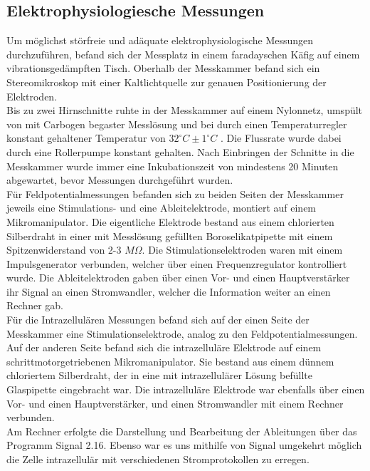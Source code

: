 \documentclass[a4paper,11pt]{report}
\begin{document}
{\subsection{Elektrophysiologiesche Messungen} 

Um möglichst störfreie und adäquate elektrophysiologische Messungen durchzuführen, befand sich der Messplatz in einem faradayschen Käfig auf einem vibrationsgedämpften Tisch. Oberhalb der Messkammer befand sich ein Stereomikroskop mit einer Kaltlichtquelle zur genauen Positionierung der Elektroden.\\

Bis zu zwei Hirnschnitte ruhte in der Messkammer auf einem Nylonnetz, umspült von mit Carbogen begaster Messlösung und bei durch einen Temperaturregler konstant gehaltener Temperatur von $32^\circ C \pm 1^\circ C$ . Die Flussrate wurde dabei durch eine Rollerpumpe konstant gehalten. Nach Einbringen der Schnitte in die Messkammer wurde immer eine Inkubationszeit von mindestens 20 Minuten abgewartet, bevor Messungen durchgeführt wurden.\\

Für Feldpotentialmessungen befanden sich zu beiden Seiten der Messkammer jeweils eine Stimulations- und eine Ableitelektrode, montiert auf einem Mikromanipulator. Die eigentliche Elektrode bestand aus einem chlorierten Silberdraht in einer mit Messlösung gefüllten Boroselikatpipette mit einem Spitzenwiderstand von 2-3 $M\Omega$. Die Stimulationselektroden waren mit einem Impulsgenerator verbunden, welcher über einen Frequenzregulator kontrolliert wurde. Die Ableitelektroden gaben über einen Vor- und einen Hauptverstärker ihr Signal an einen Stromwandler, welcher die Information weiter an einen Rechner gab.\\

Für die Intrazellulären Messungen befand sich auf der einen Seite der Messkammer eine Stimulationselektrode, analog zu den Feldpotentialmessungen. Auf der anderen Seite befand sich die intrazelluläre Elektrode auf einem schrittmotorgetriebenen Mikromanipulator. Sie bestand aus einem dünnem chloriertem Silberdraht, der in eine mit intrazellulärer Lösung befüllte Glaspipette eingebracht war. Die intrazelluläre Elektrode war ebenfalls über einen Vor- und einen Hauptverstärker, und einen Stromwandler mit einem Rechner verbunden.\\

Am Rechner erfolgte die Darstellung und Bearbeitung der Ableitungen über das Programm Signal 2.16. Ebenso war es uns mithilfe von Signal umgekehrt möglich die Zelle intrazellulär mit verschiedenen Stromprotokollen zu erregen.\\

}
\end{document}

